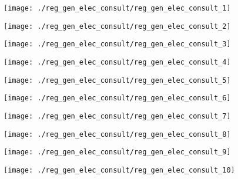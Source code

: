 \begin{figure}[!ht]
    \centering
    \texttt{[image: ./reg\_gen\_elec\_consult/reg\_gen\_elec\_consult\_1]}
\end{figure}
\clearpage

\begin{figure}[!ht]
    \centering
    \texttt{[image: ./reg\_gen\_elec\_consult/reg\_gen\_elec\_consult\_2]}
\end{figure}
\clearpage

\begin{figure}[!ht]
    \centering
    \texttt{[image: ./reg\_gen\_elec\_consult/reg\_gen\_elec\_consult\_3]}
\end{figure}
\clearpage

\begin{figure}[!ht]
    \centering
    \texttt{[image: ./reg\_gen\_elec\_consult/reg\_gen\_elec\_consult\_4]}
\end{figure}
\clearpage

\begin{figure}[!ht]
    \centering
    \texttt{[image: ./reg\_gen\_elec\_consult/reg\_gen\_elec\_consult\_5]}
\end{figure}
\clearpage

\begin{figure}[!ht]
    \centering
    \texttt{[image: ./reg\_gen\_elec\_consult/reg\_gen\_elec\_consult\_6]}
\end{figure}
\clearpage

\begin{figure}[!ht]
    \centering
    \texttt{[image: ./reg\_gen\_elec\_consult/reg\_gen\_elec\_consult\_7]}
\end{figure}
\clearpage

\begin{figure}[!ht]
    \centering
    \texttt{[image: ./reg\_gen\_elec\_consult/reg\_gen\_elec\_consult\_8]}
\end{figure}
\clearpage

\begin{figure}[!ht]
    \centering
    \texttt{[image: ./reg\_gen\_elec\_consult/reg\_gen\_elec\_consult\_9]}
\end{figure}
\clearpage

\begin{figure}[!ht]
    \centering
    \texttt{[image: ./reg\_gen\_elec\_consult/reg\_gen\_elec\_consult\_10]}
\end{figure}
\clearpage

